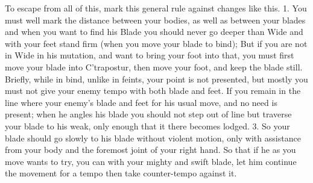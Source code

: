 To escape from all of this, mark this general rule against changes
like this. 1$.$ You must well mark the distance between your bodies,
as well as between your blades and when you want to find his Blade you
should never go deeper than Wide and with your feet stand firm (when
you move your blade to bind); But if you are not in Wide in
his mutation, and want to bring your foot into that, you must first
move your blade into C'trapostur, then move your foot, and keep the
blade still. Briefly, while in bind, unlike in feints, your point is
not presented, but mostly you must not give your enemy tempo with both
blade and feet. If you remain in the line where your enemy's blade and
feet for his usual move, and no need is present; when he angles his
blade you should not step out of line but traverse your blade to his
weak, only enough that it there becomes lodged. 3$.$ So your blade
should go slowly to his blade without violent motion, only with
assistance from your body and the foremost joint of your right
hand. So that if he as you move wants to try, you can with your mighty
and swift blade, let him continue the movement for a tempo then take
counter-tempo against it.
